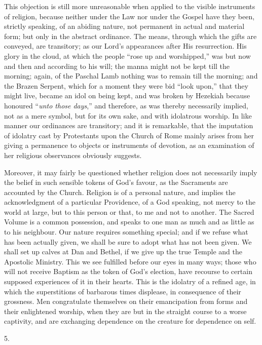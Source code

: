 This objection is still more unreasonable when applied to the
visible instruments of religion, because neither under the Law nor
under the Gospel have they been, strictly speaking, of an abiding
nature, not permanent in actual and material form; but only in the
abstract ordinance. The means, through which the gifts are conveyed,
are transitory; as our Lord's appearances after His resurrection. His
glory in the cloud, at which the people ``rose up and
worshipped,'' was but now and then and according to his will; the
manna might not be kept till the morning; again, of the Paschal Lamb
nothing was to remain till the morning; and the Brazen Serpent, which
for a moment they were bid ``look upon,'' that they might
live, became an idol on being kept, and was broken by Hezekiah because
honoured ``\emph{unto those days},'' and therefore, as
was thereby necessarily implied, not as a mere symbol, but for its own
sake, and with idolatrous worship. In like manner our ordinances are
transitory; and it is remarkable, that the imputation of idolatry cast
by Protestants upon the Church of Rome mainly arises from her giving a
permanence to objects or instruments of devotion, as an examination of
her religious observances obviously suggests.

Moreover, it may fairly be questioned whether religion does not
necessarily imply the belief in such sensible tokens of God's favour,
as the Sacraments are accounted by the Church. Religion is of a
personal nature, and implies the acknowledgment of a particular
Providence, of a God speaking, not mercy to the world at large, but to
this person or that, to me and not to another. The Sacred Volume is a
common possession, and speaks to one man as much and as little as to
his neighbour. Our nature requires something special; and if we refuse
what has been actually given, we shall be sure to adopt what has not
been given. We shall set up calves at Dan and Bethel, if we give up
the true Temple and the Apostolic Ministry. This we see fulfilled
before our eyes in many ways; those who will not receive Baptism as
the token of God's election, have recourse to certain supposed
experiences of it in their hearts. This is the idolatry of a refined
age, in which the superstitions of barbarous times displease, in
consequence of their grossness. Men congratulate themselves on their
emancipation from forms and their enlightened worship, when they are
but in the straight course to a worse captivity, and are
exchanging dependence on the creature for dependence on self.

5.

